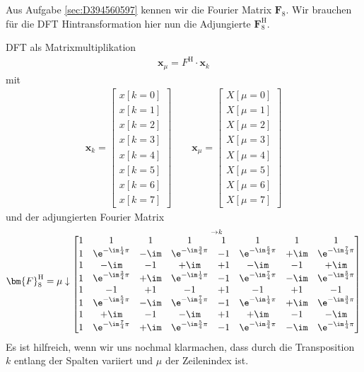 \begin{Werkzeug}
Aus Aufgabe \ref{sec:D394560597} kennen wir die Fourier Matrix $\bm{F}_8$.
Wir brauchen für die DFT Hintransformation hier nun die Adjungierte $\bm{F}^\mathrm{H}_8$.
\end{Werkzeug}
\begin{Ansatz}
DFT als Matrixmultiplikation
\begin{align}
\bm{x}_\mu = F^\mathrm{H} \cdot \bm{x}_k
\end{align}
mit
\begin{align}
%
\bm{x}_k =
\begin{bmatrix}
x[k=0]\\x[k=1]\\x[k=2]\\x[k=3]\\x[k=4]\\x[k=5]\\x[k=6]\\x[k=7]
\end{bmatrix}
%
\qquad
%
\bm{x}_\mu =
\begin{bmatrix}
X[\mu=0]\\X[\mu=1]\\X[\mu=2]\\X[\mu=3]\\X[\mu=4]\\X[\mu=5]\\X[\mu=6]\\X[\mu=7]
\end{bmatrix}
%
\end{align}
und der adjungierten Fourier Matrix
\begin{align}
\bm{F}^\mathrm{H}_8 =
\mu \downarrow
\substack{\rightarrow k\\
\begin{bmatrix}
1 & 1 & 1 & 1 & 1 & 1 & 1 & 1\\
1 & \e^{-\im\frac{1}{4}\pi} & -\im & \e^{-\im\frac{3}{4}\pi} & -1 & \e^{-\im\frac{5}{4}\pi} & +\im & \e^{-\im\frac{7}{4}\pi}\\
1 & -\im & -1 & +\im & +1 & -\im & -1 & +\im\\
1 & \e^{-\im\frac{3}{4}\pi} & +\im & \e^{-\im\frac{1}{4}\pi} & -1 & \e^{-\im\frac{7}{4}\pi} & -\im & \e^{-\im\frac{5}{4}\pi}\\
1 & -1 & +1 & -1 & +1 & -1 & +1 & -1\\
1 & \e^{-\im\frac{5}{4}\pi} & -\im & \e^{-\im\frac{7}{4}\pi} & -1 & \e^{-\im\frac{1}{4}\pi} & +\im & \e^{-\im\frac{3}{4}\pi}\\
1 & +\im & -1 & -\im & +1 & +\im & -1 & -\im\\
1 & \e^{-\im\frac{7}{4}\pi} & +\im & \e^{-\im\frac{5}{4}\pi} & -1 & \e^{-\im\frac{3}{4}\pi} & -\im & \e^{-\im\frac{1}{4}\pi}\\
\end{bmatrix}
}
%
\end{align}
Es ist hilfreich, wenn wir uns nochmal klarmachen, dass durch die Transposition
$k$ entlang der Spalten variiert und $\mu$ der Zeilenindex ist.

\end{Ansatz}
